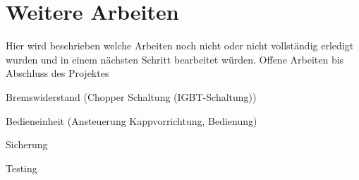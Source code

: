 \section{Weitere Arbeiten}
Hier wird beschrieben welche Arbeiten noch nicht oder nicht vollständig erledigt wurden und in einem nächsten Schritt bearbeitet würden.
Offene Arbeiten bis Abschluss des Projektes


Bremswiderstand (Chopper Schaltung (IGBT-Schaltung))

Bedieneinheit (Ansteuerung Kappvorrichtung, Bedienung)

Sicherung

Testing
